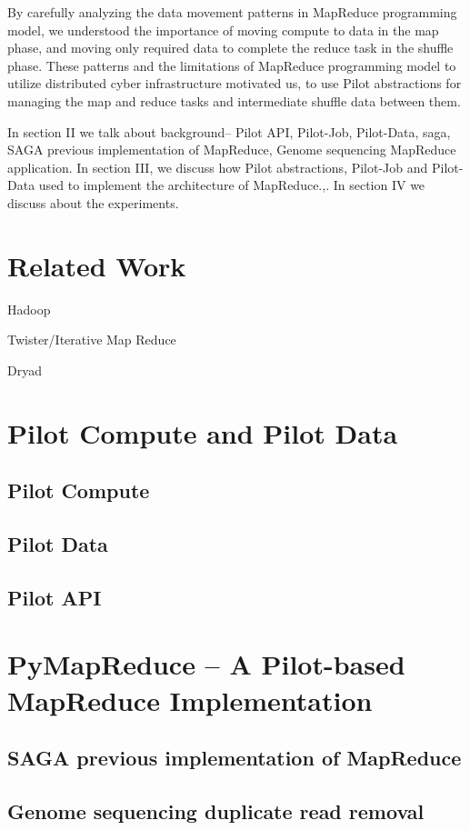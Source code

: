 \documentclass{acm_proc_article-sp}
\begin{document}
By carefully analyzing the data movement patterns in MapReduce programming
model, we understood the importance of moving compute to data in the map
phase, and moving only required data to complete the reduce task in the
shuffle phase. These patterns and the limitations of MapReduce programming
model to utilize distributed cyber infrastructure motivated us, to use Pilot
abstractions for managing the map and reduce tasks and intermediate shuffle
data between them.


In section II we talk about background-- Pilot API, Pilot-Job, Pilot-Data, saga, SAGA previous implementation of MapReduce, Genome sequencing MapReduce application. In section III, we discuss how Pilot abstractions, Pilot-Job and Pilot-Data used to implement the architecture of MapReduce.,. In section IV we discuss about the experiments.

\section{Related Work}

Hadoop

Twister/Iterative Map Reduce~\cite{Ekanayake:2010:TRI:1851476.1851593}

Dryad


\section{Pilot Compute and Pilot Data}
\subsection{Pilot Compute}
\subsection{Pilot Data}
\subsection{Pilot API}

\section{PyMapReduce -- A Pilot-based MapReduce Implementation}
\subsection{SAGA previous implementation of MapReduce}
\subsection{Genome sequencing duplicate read removal}
\end{document}
